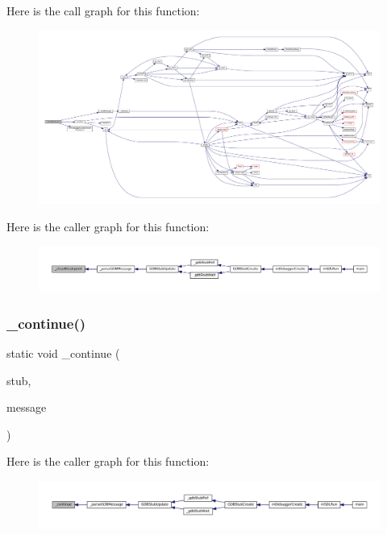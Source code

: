 Here is the call graph for this function\+:
\nopagebreak
\begin{figure}[H]
\begin{center}
\leavevmode
\includegraphics[width=350pt]{gdb-stub_8c_a53d57d6dc1ec038bf80e8e8c9bd1f6a8_cgraph}
\end{center}
\end{figure}
Here is the caller graph for this function\+:
\nopagebreak
\begin{figure}[H]
\begin{center}
\leavevmode
\includegraphics[width=350pt]{gdb-stub_8c_a53d57d6dc1ec038bf80e8e8c9bd1f6a8_icgraph}
\end{center}
\end{figure}
\mbox{\label{gdb-stub_8c_ade267028ab6c52118e785970aecd3fd9}} 
\subsubsection{\texorpdfstring{\+\_\+continue()}{\_continue()}}
{\footnotesize\ttfamily static void \+\_\+continue (\begin{DoxyParamCaption}\item[{struct G\+D\+B\+Stub $\ast$}]{stub,  }\item[{const char $\ast$}]{message }\end{DoxyParamCaption})\hspace{0.3cm}{\ttfamily [static]}}

Here is the caller graph for this function\+:
\nopagebreak
\begin{figure}[H]
\begin{center}
\leavevmode
\includegraphics[width=350pt]{gdb-stub_8c_ade267028ab6c52118e785970aecd3fd9_icgraph}
\end{center}
\end{figure}
\mbox{\label{gdb-stub_8c_a2efa3a2574e849468b6c893d8fae58ca}} 

